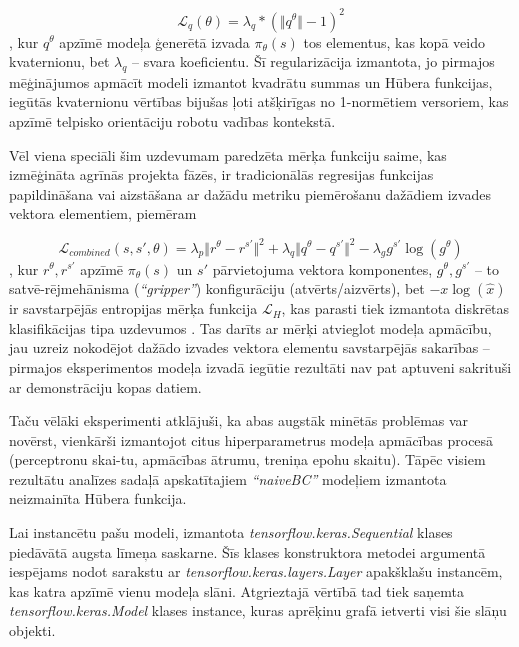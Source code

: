 \documentclass[12pt, a4paper]{article}
\numberwithin{equation}{section} %
\begin{document}
\begin{equation}
    \mathcal{L}_{q}(\theta) = \lambda_{q} * (\Vert q^{\theta} \Vert - 1)^2
\end{equation}
, kur $q^{\theta}$ apzīmē modeļa ģenerētā izvada $\pi_{\theta}(s)$ tos elementus, kas kopā veido kvaternionu, bet $\lambda_q$ -- svara koeficientu. Šī regularizācija izmantota, jo pirmajos mēģinājumos apmācīt modeli izmantot kvadrātu summas un Hūbera funkcijas, iegūtās kvaternionu vērtības bijušas ļoti atšķirīgas no 1-normētiem versoriem, kas apzīmē telpisko orientāciju robotu vadības kontekstā. 

Vēl viena speciāli šim uzdevumam paredzēta mērķa funkciju saime, kas izmēģināta agrīnās projekta fāzēs, ir tradicionālās regresijas funkcijas papildināšana vai aizstāšana ar dažādu metriku piemērošanu dažādiem izvades vektora elementiem, piemēram

\begin{equation}
    \mathcal{L}_{combined}(s,s',\theta) = \lambda_p \Vert r^{\theta} - r^{s'}\Vert^2 + 
    \lambda_q \Vert q^{\theta} - q^{s'}\Vert^2 - 
    \lambda_g  g^{s'} \log(g^{\theta})
\end{equation}
, kur $r^{\theta}, r^{s'}$ apzīmē $\pi_{\theta}(s)$ un $s'$ pārvietojuma vektora komponentes, $g^{\theta}, g^{s'}$  -- to satvē-rējmehānisma (\textit{``gripper''}) konfigurāciju (atvērts/aizvērts), bet $-x\log(\hat{x})$ ir savstarpējās entropijas mērķa funkcija $\mathcal{L}_H$, kas parasti tiek izmantota diskrētas klasifikācijas tipa uzdevumos \cite{keras_crossentropy}. Tas darīts ar mērķi atvieglot modeļa apmācību, jau uzreiz nokodējot dažādo izvades vektora elementu savstarpējās sakarības -- pirmajos eksperimentos modeļa izvadā iegūtie rezultāti nav pat aptuveni sakrituši ar demonstrāciju kopas datiem.

Taču vēlāki eksperimenti atklājuši, ka abas augstāk minētās problēmas var novērst, vienkārši izmantojot citus hiperparametrus modeļa apmācības procesā (perceptronu skai-tu, apmācības ātrumu, treniņa epohu skaitu). Tāpēc visiem rezultātu analīzes sadaļā apskatītajiem \textit{``naiveBC''} modeļiem izmantota neizmainīta Hūbera funkcija.

Lai instancētu pašu modeli, izmantota \textit{tensorflow.keras.Sequential} klases piedāvātā augsta līmeņa saskarne. Šīs klases konstruktora metodei argumentā iespējams nodot sarakstu ar \textit{tensorflow.keras.layers.Layer} apakšklašu instancēm, kas katra apzīmē vienu modeļa slāni. Atgrieztajā vērtībā tad tiek saņemta \textit{tensorflow.keras.Model} klases instance, kuras aprēķinu grafā ietverti visi šie slāņu objekti.
\end{document}
